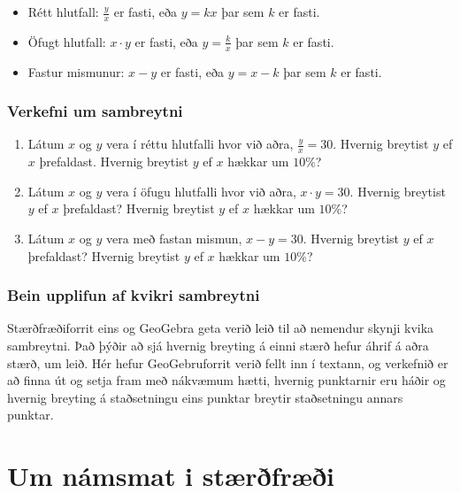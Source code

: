 \documentclass[
  icelandic,
]{book}
\providecommand{\tightlist}{%
  \setlength{\itemsep}{0pt}\setlength{\parskip}{0pt}}
\theoremstyle{definition}
\theoremstyle{definition}
\theoremstyle{definition}
\theoremstyle{definition}
\theoremstyle{remark}
\begin{document}
\begin{itemize}
\tightlist
\item
  Rétt hlutfall: \(\frac{y}{x}\) er fasti, eða \(y = kx\) þar sem \(k\) er fasti.
\item
  Öfugt hlutfall: \(x \cdot y\) er fasti, eða \(y = \frac{k}{x}\) þar sem \(k\) er fasti.\\
\item
  Fastur mismunur: \(x - y\) er fasti, eða \(y = x - k\) þar sem \(k\) er fasti.
\end{itemize}

\subsection{Verkefni um sambreytni}\label{verkefni-sambreytni}

\begin{enumerate}
\def\labelenumi{\alph{enumi}.}
\tightlist
\item
  Látum \(x\) og \(y\) vera í réttu hlutfalli hvor við aðra, \(\frac{y}{x}=30\). Hvernig breytist \(y\) ef \(x\) þrefaldast. Hvernig breytist \(y\) ef \(x\) hækkar um \(10\%\)?
\item
  Látum \(x\) og \(y\) vera í öfugu hlutfalli hvor við aðra, \(x \cdot y=30\). Hvernig breytist \(y\) ef \(x\) þrefaldast? Hvernig breytist \(y\) ef \(x\) hækkar um \(10\%\)?\\
\item
  Látum \(x\) og \(y\) vera með fastan mismun, \(x - y = 30\). Hvernig breytist \(y\) ef \(x\) þrefaldast? Hvernig breytist \(y\) ef \(x\) hækkar um \(10\%\)?
\end{enumerate}

\subsection{Bein upplifun af kvikri sambreytni}\label{ggb-sambreytni_1}

Stærðfræðiforrit eins og GeoGebra geta verið leið til að nemendur skynji kvika sambreytni. Það þýðir að sjá hvernig breyting á einni stærð hefur áhrif á aðra stærð, um leið. Hér hefur GeoGebruforrit verið fellt inn í textann, og verkefnið er að finna út og setja fram með nákvæmum hætti, hvernig punktarnir eru háðir og hvernig breyting á staðsetningu eins punktar breytir staðsetningu annars punktar.

\chapter{Um námsmat i stærðfræði}\label{namsmat_kafli}
\end{document}
